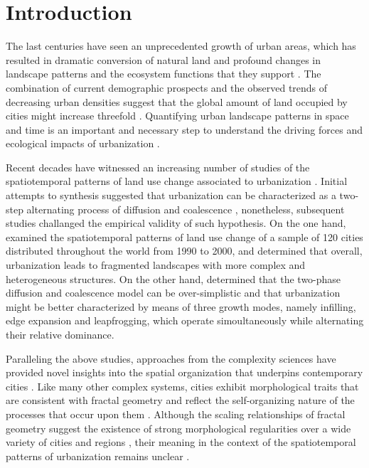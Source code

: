 \section*{Introduction}

The last centuries have seen an unprecedented growth of urban areas, which has resulted in dramatic conversion of natural land and profound changes in landscape patterns and the ecosystem functions that they support \citep{alberti2005effects}.
The combination of current demographic prospects and the observed trends of decreasing urban densities suggest that the global amount of land occupied by cities might increase threefold \citep{angel2005dynamics}.
Quantifying urban landscape patterns in space and time is an important and necessary step to understand the driving forces and ecological impacts of urbanization \citep{wu2014urban}. 

Recent decades have witnessed an increasing number of studies of the spatiotemporal patterns of land use change associated to urbanization \citep{dietzel2005spatio, seto2005quantifying, schneider2008compact, jenerette2010global, wu2011quantifying, li2013quantifying, liu2016general, nong2018quantifying}.
Initial attempts to synthesis suggested that urbanization can be characterized as a two-step alternating process of diffusion and coalescence \citep{dietzel2005spatio, schneider2008compact}, nonetheless, subsequent studies challanged the empirical validity of such hypothesis.
On the one hand, \cite{jenerette2010global} examined the spatiotemporal patterns of land use change of a sample of 120 cities distributed throughout the world from 1990 to 2000, and determined that overall, urbanization leads to fragmented landscapes with more complex and heterogeneous structures. On the other hand, \cite{li2013quantifying} determined that the two-phase diffusion and coalescence model can be over-simplistic and that urbanization might be better characterized by means of three growth modes, namely infilling, edge expansion and leapfrogging, which operate simoultaneously while alternating their relative dominance.

Paralleling the above studies, approaches from the complexity sciences have provided novel insights into the spatial organization that underpins contemporary cities \citep{batty2005cities}.
Like many other complex systems, cities exhibit morphological traits that are consistent with fractal geometry and reflect the self-organizing nature of the processes that occur upon them \citep{white1993cellular}.
Although the scaling relationships of fractal geometry suggest the existence of strong morphological regularities over a wide variety of cities and regions \citep{frankhauser1994fractalite, batty1994fractal, white2015modeling}, their meaning in the context of the spatiotemporal patterns of urbanization remains unclear \citep{li2000fractal, manson2006complexity, bosch2019addressing}.

